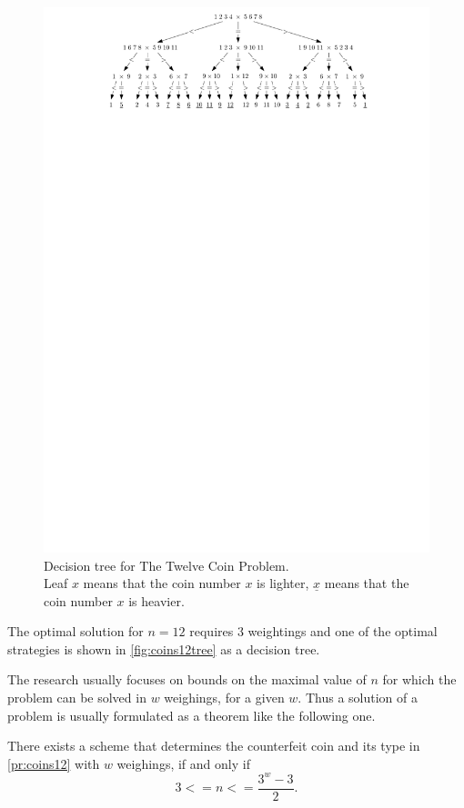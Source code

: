 \begin{figure}
\includegraphics[width=\textwidth]{pictures/coins12.pdf}
\caption{Decision tree for The Twelve Coin Problem. \\
Leaf $x$ means that the coin number $x$ is lighter, $\underline{x}$ means that
the coin number $x$ is heavier.}
\label{fig:coins12tree}
\end{figure}

The optimal solution for $n=12$ requires 3 weightings and one of the optimal
  strategies is shown in \autoref{fig:coins12tree} as a decision tree.

The research usually focuses on bounds on the maximal value of $n$
  for which the problem can be solved in $w$ weighings, for a given $w$.
Thus a solution of a problem is usually formulated as a theorem like the
  following one.

\begin{theorem}\label{th:coins12}
There exists a scheme that determines the counterfeit coin and
  its type in \autoref{pr:coins12} with $w$ weighings,
  if and only if
  \[ 3 <= n <=\frac{3^w - 3}{2}. \]
\end{theorem}

